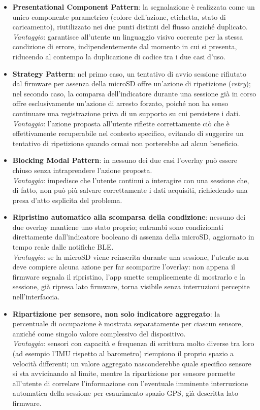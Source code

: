 \begin{itemize}
    \item \textbf{Presentational Component Pattern}: la segnalazione è realizzata come un unico componente parametrico (colore
    dell'azione, etichetta, stato di caricamento), riutilizzato nei due punti distinti del flusso anziché duplicato.\\
    \textit{Vantaggio}: garantisce all'utente un linguaggio visivo coerente per la stessa condizione di errore, indipendentemente dal momento in
    cui si presenta, riducendo al contempo la duplicazione di codice tra i due casi d'uso.
    \item \textbf{Strategy Pattern}: nel primo caso, un tentativo di avvio sessione rifiutato dal firmware per assenza della
    microSD offre un'azione di ripetizione (\emph{retry}); nel secondo caso, la comparsa dell'indicatore durante una sessione già in corso offre
    esclusivamente un'azione di arresto forzato, poiché non ha senso continuare una registrazione priva di un supporto su cui persistere i dati.\\
    \textit{Vantaggio}: l'azione proposta all'utente riflette correttamente ciò che è effettivamente recuperabile nel contesto specifico, evitando
    di suggerire un tentativo di ripetizione quando ormai non porterebbe ad alcun beneficio.
    \item \textbf{Blocking Modal Pattern}: in nessuno dei due casi l'overlay può essere chiuso senza intraprendere l'azione proposta.\\
    \textit{Vantaggio}: impedisce che l'utente continui a interagire con una sessione che, di fatto, non può più salvare correttamente i dati
    acquisiti, richiedendo una presa d'atto esplicita del problema.
    \item \textbf{Ripristino automatico alla scomparsa della condizione}: nessuno dei due overlay mantiene uno stato proprio; entrambi sono
    condizionati direttamente dall'indicatore booleano di assenza della microSD, aggiornato in tempo reale dalle notifiche BLE.\\
    \textit{Vantaggio}: se la microSD viene reinserita durante una sessione, l'utente non deve compiere alcuna azione per far scomparire l'overlay:
    non appena il firmware segnala il ripristino, l'app smette semplicemente di mostrarlo e la sessione, già ripresa lato firmware, torna visibile
    senza interruzioni percepite nell'interfaccia.
    \item \textbf{Ripartizione per sensore, non solo indicatore aggregato}: la percentuale di occupazione è mostrata separatamente per ciascun
    sensore, anziché come singolo valore complessivo del dispositivo.\\
    \textit{Vantaggio}: sensori con capacità e frequenza di scrittura molto diverse tra loro (ad esempio l'IMU rispetto al barometro) riempiono il
    proprio spazio a velocità differenti; un valore aggregato nasconderebbe quale specifico sensore si sta avvicinando al limite, mentre la
    ripartizione per sensore permette all'utente di correlare l'informazione con l'eventuale imminente interruzione automatica della sessione per
    esaurimento spazio GPS, già descritta lato firmware.
\end{itemize}

